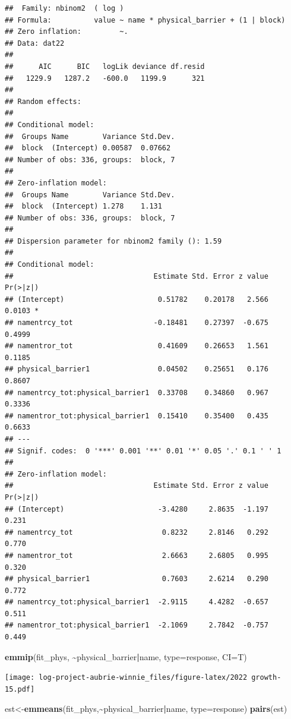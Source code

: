 \documentclass[
]{article}
\newenvironment{Shaded}{\begin{snugshade}}{\end{snugshade}}
\newcommand{\AttributeTok}[1]{\textcolor[rgb]{0.13,0.29,0.53}{#1}}
\newcommand{\FunctionTok}[1]{\textcolor[rgb]{0.13,0.29,0.53}{\textbf{#1}}}
\newcommand{\NormalTok}[1]{#1}
\newcommand{\OtherTok}[1]{\textcolor[rgb]{0.56,0.35,0.01}{#1}}
\newcommand{\SpecialCharTok}[1]{\textcolor[rgb]{0.81,0.36,0.00}{\textbf{#1}}}
\newcommand{\StringTok}[1]{\textcolor[rgb]{0.31,0.60,0.02}{#1}}
\begin{document}
\begin{verbatim}
##  Family: nbinom2  ( log )
## Formula:          value ~ name * physical_barrier + (1 | block)
## Zero inflation:         ~.
## Data: dat22
## 
##      AIC      BIC   logLik deviance df.resid 
##   1229.9   1287.2   -600.0   1199.9      321 
## 
## Random effects:
## 
## Conditional model:
##  Groups Name        Variance Std.Dev.
##  block  (Intercept) 0.00587  0.07662 
## Number of obs: 336, groups:  block, 7
## 
## Zero-inflation model:
##  Groups Name        Variance Std.Dev.
##  block  (Intercept) 1.278    1.131   
## Number of obs: 336, groups:  block, 7
## 
## Dispersion parameter for nbinom2 family (): 1.59 
## 
## Conditional model:
##                                 Estimate Std. Error z value Pr(>|z|)  
## (Intercept)                      0.51782    0.20178   2.566   0.0103 *
## namentrcy_tot                   -0.18481    0.27397  -0.675   0.4999  
## namentror_tot                    0.41609    0.26653   1.561   0.1185  
## physical_barrier1                0.04502    0.25651   0.176   0.8607  
## namentrcy_tot:physical_barrier1  0.33708    0.34860   0.967   0.3336  
## namentror_tot:physical_barrier1  0.15410    0.35400   0.435   0.6633  
## ---
## Signif. codes:  0 '***' 0.001 '**' 0.01 '*' 0.05 '.' 0.1 ' ' 1
## 
## Zero-inflation model:
##                                 Estimate Std. Error z value Pr(>|z|)
## (Intercept)                      -3.4280     2.8635  -1.197    0.231
## namentrcy_tot                     0.8232     2.8146   0.292    0.770
## namentror_tot                     2.6663     2.6805   0.995    0.320
## physical_barrier1                 0.7603     2.6214   0.290    0.772
## namentrcy_tot:physical_barrier1  -2.9115     4.4282  -0.657    0.511
## namentror_tot:physical_barrier1  -2.1069     2.7842  -0.757    0.449
\end{verbatim}

\begin{Shaded}
\begin{Highlighting}[]
\FunctionTok{emmip}\NormalTok{(fit\_phys, }\SpecialCharTok{\textasciitilde{}}\NormalTok{physical\_barrier}\SpecialCharTok{|}\NormalTok{name, }\AttributeTok{type=}\StringTok{\textquotesingle{}response\textquotesingle{}}\NormalTok{, }\AttributeTok{CI=}\NormalTok{T)}
\end{Highlighting}
\end{Shaded}

\texttt{[image: log-project-aubrie-winnie\_files/figure-latex/2022 growth-15.pdf]}

\begin{Shaded}
\begin{Highlighting}[]
\NormalTok{est}\OtherTok{\textless{}{-}}\FunctionTok{emmeans}\NormalTok{(fit\_phys,}\SpecialCharTok{\textasciitilde{}}\NormalTok{physical\_barrier}\SpecialCharTok{|}\NormalTok{name, }\AttributeTok{type=}\StringTok{\textquotesingle{}response\textquotesingle{}}\NormalTok{)}
\FunctionTok{pairs}\NormalTok{(est)}
\end{Highlighting}
\end{Shaded}
\end{document}
